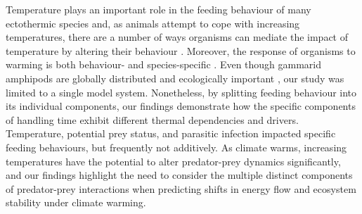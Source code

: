 Temperature plays an important role in the feeding behaviour of many ectothermic species and, as animals attempt to cope with increasing temperatures, there are a number of ways organisms can mediate the impact of temperature by altering their behaviour \citep{barnes2015, vandervorste2017}. Moreover, the response of organisms to warming is both behaviour- and species-specific \citep{dell2011, enlund2011, ohlund2015, kenna2017}. Even though gammarid amphipods are globally distributed \citep{karaman1977} and ecologically important \citep{little2018}, our study was limited to a single model system. Nonetheless, by splitting feeding behaviour into its individual components, our findings demonstrate how the specific components of handling time exhibit different thermal dependencies and drivers. Temperature, potential prey status, and parasitic infection impacted specific feeding behaviours, but frequently not additively. As climate warms, increasing temperatures have the potential to alter predator-prey dynamics significantly, and our findings highlight the need to consider the multiple distinct components of predator-prey interactions when predicting shifts in energy flow and ecosystem stability under climate warming. 